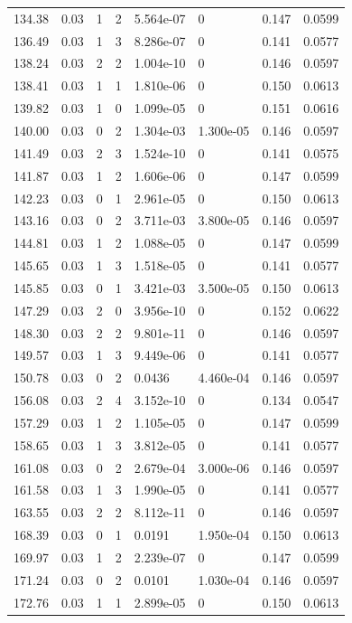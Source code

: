 \documentclass[preview]{standalone}
\begin{document}
{{{\begin{tabular}{L{1.2cm}C{1.2cm} C{0.3cm}C{0.5cm} C{1.4cm}C{1.4cm} C{1.4cm}C{1.4cm}}
  134.38  &  0.03  & 1     &  2 &  5.564e-07  & 0  & 0.147 &  0.0599   \\ 
  136.49  &  0.03  & 1     &  3 &  8.286e-07  & 0  & 0.141 &  0.0577   \\ 
  138.24  &  0.03  & 2     &  2 &  1.004e-10  & 0  & 0.146 &  0.0597   \\ 
  138.41  &  0.03  & 1     &  1 &  1.810e-06  & 0  & 0.150 &  0.0613   \\ 
  139.82  &  0.03  & 1     &  0 &  1.099e-05  & 0  & 0.151 &  0.0616   \\ 
  140.00  &  0.03  & 0     &  2 &  1.304e-03  & 1.300e-05  & 0.146 &  0.0597   \\ 
  141.49  &  0.03  & 2     &  3 &  1.524e-10  & 0  & 0.141 &  0.0575   \\ 
  141.87  &  0.03  & 1     &  2 &  1.606e-06  & 0  & 0.147 &  0.0599   \\ 
  142.23  &  0.03  & 0     &  1 &  2.961e-05  & 0  & 0.150 &  0.0613   \\ 
  143.16  &  0.03  & 0     &  2 &  3.711e-03  & 3.800e-05  & 0.146 &  0.0597   \\ 
  144.81  &  0.03  & 1     &  2 &  1.088e-05  & 0  & 0.147 &  0.0599   \\ 
  145.65  &  0.03  & 1     &  3 &  1.518e-05  & 0  & 0.141 &  0.0577   \\ 
  145.85  &  0.03  & 0     &  1 &  3.421e-03  & 3.500e-05  & 0.150 &  0.0613   \\ 
  147.29  &  0.03  & 2     &  0 &  3.956e-10  & 0  & 0.152 &  0.0622   \\ 
  148.30  &  0.03  & 2     &  2 &  9.801e-11  & 0  & 0.146 &  0.0597   \\ 
  149.57  &  0.03  & 1     &  3 &  9.449e-06  & 0  & 0.141 &  0.0577   \\ 
  150.78  &  0.03  & 0     &  2 &  0.0436  & 4.460e-04  & 0.146 &  0.0597   \\ 
  156.08  &  0.03  & 2     &  4 &  3.152e-10  & 0  & 0.134 &  0.0547   \\ 
  157.29  &  0.03  & 1     &  2 &  1.105e-05  & 0  & 0.147 &  0.0599   \\ 
  158.65  &  0.03  & 1     &  3 &  3.812e-05  & 0  & 0.141 &  0.0577   \\ 
  161.08  &  0.03  & 0     &  2 &  2.679e-04  & 3.000e-06  & 0.146 &  0.0597   \\ 
  161.58  &  0.03  & 1     &  3 &  1.990e-05  & 0  & 0.141 &  0.0577   \\ 
  163.55  &  0.03  & 2     &  2 &  8.112e-11  & 0  & 0.146 &  0.0597   \\ 
  168.39  &  0.03  & 0     &  1 &  0.0191  & 1.950e-04  & 0.150 &  0.0613   \\ 
  169.97  &  0.03  & 1     &  2 &  2.239e-07  & 0  & 0.147 &  0.0599   \\ 
  171.24  &  0.03  & 0     &  2 &  0.0101  & 1.030e-04  & 0.146 &  0.0597   \\ 
  172.76  &  0.03  & 1     &  1 &  2.899e-05  & 0  & 0.150 &  0.0613   \\ 
\hline 
\end{tabular} 

}}}
\end{document}
